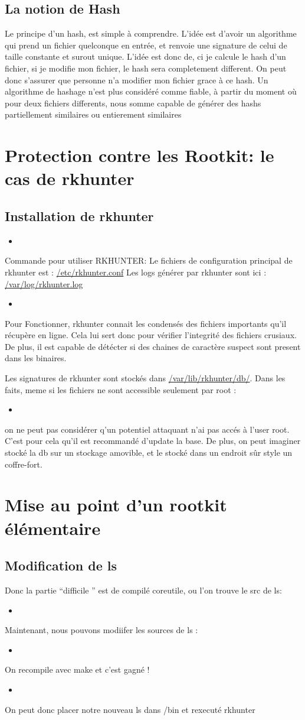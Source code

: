 \documentclass[10pt,a4paper]{article}
\newcommand{\insertcode}[2]{\begin{itemize}\item[]\end{itemize}}
\begin{document}
 \subsection{La notion de Hash}
 Le principe d'un hash, est simple à comprendre. L'idée est d'avoir un algorithme qui prend un fichier quelconque en entrée, et renvoie une signature de celui de taille constante et surout unique.
 L'idée est donc de, ci je calcule le hash d'un fichier, si je modifie mon fichier, le hash sera completement different.
 On peut donc s'assurer que personne n'a modifier mon fichier grace à ce hash.
 Un algorithme de hashage n'est plus considéré comme fiable, à partir du moment où pour deux fichiers differents, nous somme capable de générer des hashs partiellement similaires ou entierement similaires
 
\section{Protection contre les Rootkit:  le cas de rkhunter}
\subsection{   Installation de rkhunter }
\insertcode{commande/installRkhunter.txt}{Installation de RKHUNTER}

Commande pour utiliser RKHUNTER:
Le fichiers de configuration principal de rkhunter est : \url{/etc/rkhunter.conf}
Les logs générer par rkhunter sont ici : \url{/var/log/rkhunter.log}
\insertcode{commande/manrkhunter.txt}{Commade pour utiliser RKHUNTER }

Pour Fonctionner, rkhunter connait les condensés des fichiers importants  qu'il récupère en ligne. Cela lui sert donc pour vérifier l'integrité des fichiers crusiaux. De plus, il est capable de détécter si des chaines de caractère suspect sont present dans les binaires.

Les signatures de rkhunter sont stockés dans \url{/var/lib/rkhunter/db/}.
Dans les faits, meme si les fichiers ne sont accessible seulement par root :
\insertcode{commande/lsdb.txt}{Droits du dossier ``signature''}
on ne peut pas considérer q'un potentiel attaquant n'ai pas accés à l'user root. C'est pour cela qu'il est recommandé d'update la base. De plus, on peut imaginer stocké la db sur un stockage amovible, et le stocké dans un endroit sûr style un coffre-fort. 
\section{Mise au point d'un rootkit élémentaire }
\subsection{Modification de ls}
Donc la partie ``difficile '' est de compilé coreutile, ou l'on trouve le src de ls:
\insertcode{commande/installls.txt}{Compilation}

Maintenant, nous pouvons modiifer les sources de ls :
\insertcode{commande/diffls.txt}{Ls custom}
On recompile avec make et c'est gagné !
\insertcode{commande/lsstdout.txt}{Ls custom stdout}
On peut donc placer notre nouveau ls dans /bin et rexecuté rkhunter
\end{document}
